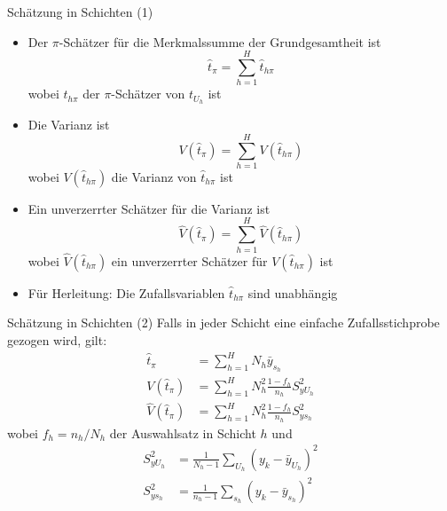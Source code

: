 \documentclass[9pt]{beamer}
\begin{document}
\begin{frame}{Schätzung in Schichten (1)}
\begin{itemize}
	\item Der $\pi$-Schätzer für die Merkmalssumme der Grundgesamtheit ist
	$$\hat{t}_\pi = \sum_{h=1}^H \hat{t}_{h\pi}$$
	wobei $\hat{t}_{h\pi}$ der $\pi$-Schätzer von $t_{U_h}$ ist
	\item Die Varianz ist
	$$V(\hat{t}_\pi) = \sum_{h=1}^H V(\hat{t}_{h\pi})$$
	wobei $V(\hat{t}_{h\pi})$ die Varianz von $\hat{t}_{h\pi}$ ist
	\item Ein unverzerrter Schätzer für die Varianz ist
	$$\hat{V}(\hat{t}_\pi) = \sum_{h=1}^H \hat{V}(\hat{t}_{h\pi})$$
	wobei $\hat{V}(\hat{t}_{h\pi})$ ein unverzerrter Schätzer für $V(\hat{t}_{h\pi})$ ist
	\item Für Herleitung: Die Zufallsvariablen $\hat{t}_{h\pi}$ sind unabhängig
\end{itemize}
\end{frame}


\begin{frame}{Schätzung in Schichten (2)}
Falls in jeder Schicht eine einfache Zufallsstichprobe gezogen wird, gilt:
\begin{align*}	
\hat{t}_\pi &= \sum_{h=1}^H N_h \bar{y}_{s_h}\\
V(\hat{t}_\pi) &= \sum_{h=1}^H N_h^2 \frac{1-f_h}{n_h}S_{yU_h}^2\\ 
\hat{V}(\hat{t}_\pi) &= \sum_{h=1}^H N_h^2 \frac{1-f_h}{n_h} S_{y s_h}^2
\end{align*}
wobei $f_h=n_h/N_h$ der Auswahlsatz in Schicht $h$ und
\begin{align*}
S_{y U_h}^2 &= \frac{1}{N_h -1}\sum_{U_h}(y_k - \bar{y}_{U_h})^2\\
S_{y s_h}^2 &= \frac{1}{n_h -1}\sum_{s_h}(y_k - \bar{y}_{s_h})^2
\end{align*}
\end{frame}
\end{document}
